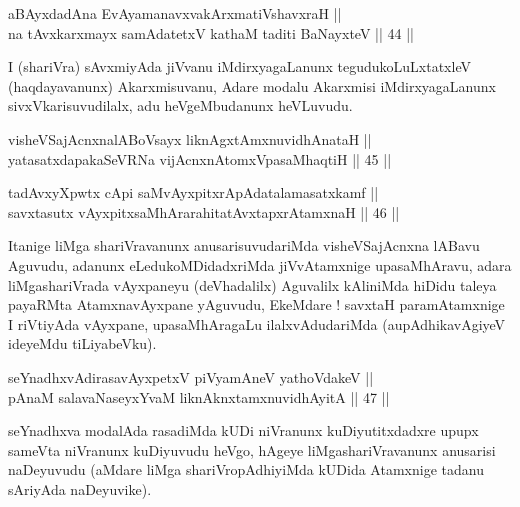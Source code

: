 \begin{shl}
aBAyxdadAna EvAyamanavxvakArxmatiVshavxraH || \\
na tAvxkarxmayx samAdatetxV kathaM taditi BaNayxteV \hfill || 44 ||  
\end{shl}

\begin{artha}
I (shariVra) sAvxmiyAda jiVvanu iMdirxyagaLanunx tegudukoLuLxtatxleV
(haqdayavanunx) Akarxmisuvanu, Adare modalu Akarxmisi iMdirxyagaLanunx
sivxVkarisuvudilalx, adu heVgeMbudanunx heVLuvudu.
\end{artha}


\begin{shl}
visheVSajAcnxnalABoV\s sayx liknAgxtAmxnuvidhAnataH || \\
yatasatxdapakaSeVRNa vijAcnxnAtomxVpasaMhaqtiH \hfill || 45 ||  
\end{shl}

\begin{shl}
tadAvxyXpwtx cApi saMvAyxpitxrApAdatalamasatxkamf || \\
savxtasutx vAyxpitxsaMhArarahitatAvxtapxrAtamxnaH \hfill || 46 ||  
\end{shl}

\begin{artha}
Itanige liMga shariVravanunx anusarisuvudariMda visheVSajAcnxna lABavu
Aguvudu, adanunx eLedukoMDidadxriMda jiVvAtamxnige upasaMhAravu, adara
liMgashariVrada vAyxpaneyu (deVhadalilx) Aguvalilx kAliniMda hiDidu
taleya payaRMta AtamxnavAyxpane yAguvudu, EkeMdare ! savxtaH
paramAtamxnige I riVtiyAda vAyxpane, upasaMhAragaLu ilalxvAdudariMda
(aupAdhikavAgiyeV ideyeMdu tiLiyabeVku).
\end{artha}


\begin{shl}
seYnadhxvAdirasavAyxpetxV piVyamAneV yathoVdakeV || \\
pAnaM salavaNaseyxYvaM liknAknxtamxnuvidhAyitA \hfill || 47 ||  
\end{shl}

\begin{artha}
seYnadhxva modalAda rasadiMda kUDi niVranunx kuDiyutitxdadxre upupx
sameVta niVranunx kuDiyuvudu heVgo, hAgeye liMgashariVravanunx
anusarisi naDeyuvudu (aMdare liMga shariVropAdhiyiMda kUDida Atamxnige
tadanu sAriyAda naDeyuvike).
\end{artha}

